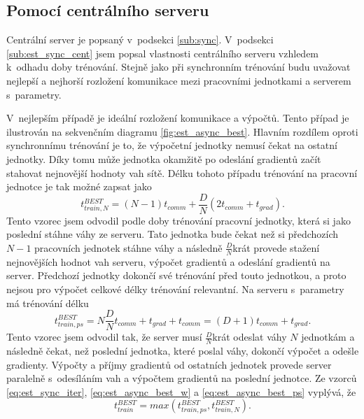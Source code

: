 \subsection{Pomocí centrálního serveru}
\label{sub:est_async_cent}

Centrální server je popsaný v~podsekci \ref{sub:sync}.
V~podsekci \ref{sub:est_sync_cent} jsem popsal vlastnosti centrálního serveru vzhledem k~odhadu doby trénování.
Stejně jako při synchronním trénování budu uvažovat nejlepší a nejhorší rozložení komunikace mezi pracovními jednotkami a serverem s~parametry.

V~nejlepším případě je ideální rozložení komunikace a výpočtů.
Tento případ je ilustrován na sekvenčním diagramu \ref{fig:est_async_best}.
Hlavním rozdílem oproti synchronnímu trénování je to, že výpočetní jednotky nemusí čekat na ostatní jednotky.
Díky tomu může jednotka okamžitě po odeslání gradientů začít stahovat nejnovější hodnoty vah sítě.
Délku tohoto případu trénování na pracovní jednotce je tak možné zapsat jako \begin{equation}t_{train,N}^{BEST}=(N-1)t_{comm}+\frac{D}{N}(2t_{comm}+t_{grad}).\label{eq:est_async_best_w}\end{equation}
Tento vzorec jsem odvodil podle doby trénování pracovní jednotky, která si jako poslední stáhne váhy ze serveru.
Tato jednotka bude čekat než si předchozích $N-1$ pracovních jednotek stáhne váhy a následně $\frac{D}{N}$krát provede stažení nejnovějších hodnot vah serveru, výpočet gradientů a odeslání gradientů na server.
Předchozí jednotky dokončí své trénování před touto jednotkou, a proto nejsou pro výpočet celkové délky trénování relevantní.
Na serveru s~parametry má trénování délku \begin{equation}t_{train,ps}^{BEST}=N\frac{D}{N}t_{comm}+t_{grad}+t_{comm}=(D+1)t_{comm}+t_{grad}.\label{eq:est_async_best_ps}\end{equation}
Tento vzorec jsem odvodil tak, že server musí $\frac{D}{N}$krát odeslat váhy $N$ jednotkám a následně čekat, než poslední jednotka, které poslal váhy, dokončí výpočet a odešle gradienty.
Výpočty a příjmy gradientů od ostatních jednotek provede server paralelně s~odesíláním vah a výpočtem gradientů na poslední jednotce.
Ze vzorců \ref{eq:est_sync_iter}, \ref{eq:est_async_best_w} a \ref{eq:est_async_best_ps} vyplývá, že \begin{equation}t_{train}^{BEST}=max(t_{train,ps}^{BEST},t_{train,N}^{BEST}).\label{eq:est_async_best_f}\end{equation}

